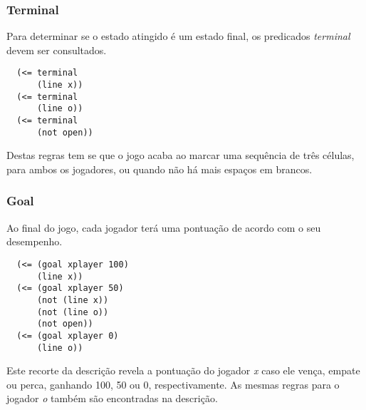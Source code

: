 \subsubsection*{Terminal}
Para determinar se o estado atingido é um estado final, os predicados \textit{terminal} devem ser consultados. 
\begin{verbatim}                                                                                         
  (<= terminal                                                                                           
      (line x))                                                                                                                                                                                
  (<= terminal                                                                                           
      (line o))                                                                                          
  (<= terminal                                                                                           
      (not open))                                                                                        
\end{verbatim}
Destas regras tem se que o jogo acaba ao marcar uma sequência de três células, para ambos os jogadores, ou quando não há mais espaços em brancos.

\subsubsection*{Goal}
Ao final do jogo, cada jogador terá uma pontuação de acordo com o seu desempenho. 
\begin{verbatim}
  (<= (goal xplayer 100)                                                                                 
      (line x))                                                                                          
  (<= (goal xplayer 50)                                                                                  
      (not (line x))                                                                                     
      (not (line o))                                                                                     
      (not open))                                                                                        
  (<= (goal xplayer 0)                                                                                   
      (line o))   
\end{verbatim}
Este recorte da descrição revela a pontuação do jogador \textit{x} caso ele vença, empate ou perca, ganhando 100, 50 ou 0, respectivamente. As mesmas regras para o jogador \textit{o} também são encontradas na descrição.

